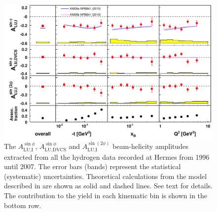 \begin{figure}
 \begin{center}
 \includegraphics[width=15cm]{bsadvcsplots_eml_par13_bin6_release_all_pic_update}
  \caption{The $A_{\textrm{LU,I}}^{\sin\phi}$, $A_{\textrm{LU,DVCS}}^{\sin\phi}$ and
$A_{\textrm{LU,I}}^{\sin(2\phi)}$ beam-helicity amplitudes extracted from all the hydrogen data recorded at H{\sc ermes}
from 1996 until 2007. The error bars (bands) represent the statistical
(systematic) uncertainties. Theoretical calculations from the model described in \cite{Kumericki} are shown as solid and dashed lines. See text for details. The  contribution  to the yield in each kinematic bin is shown in the bottom row.}
  \label{bsa_xbjrange}
 \end{center}
\end{figure}

